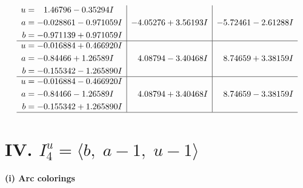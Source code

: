 \documentclass[1p]{elsarticle_modified}
\theoremstyle{definition}
\begin{document}
$$\begin{array}{c|c|c}
\begin{aligned}
u &= \phantom{-}1.46796 - 0.35294 I \\
a &= -0.028861 - 0.971059 I \\
b &= -0.971139 + 0.971059 I\end{aligned}
 & -4.05276 + 3.56193 I & -5.72461 - 2.61288 I \\ \hline\begin{aligned}
u &= -0.016884 + 0.466920 I \\
a &= -0.84466 + 1.26589 I \\
b &= -0.155342 - 1.265890 I\end{aligned}
 & \phantom{-}4.08794 - 3.40468 I & \phantom{-}8.74659 + 3.38159 I \\ \hline\begin{aligned}
u &= -0.016884 - 0.466920 I \\
a &= -0.84466 - 1.26589 I \\
b &= -0.155342 + 1.265890 I\end{aligned}
 & \phantom{-}4.08794 + 3.40468 I & \phantom{-}8.74659 - 3.38159 I\\
 \hline 
 \end{array}$$\newpage\newpage\renewcommand{\arraystretch}{1}
\centering \section*{IV. $I^u_{4}= \langle b,\;a-1,\;u-1 \rangle$}
\flushleft \textbf{(i) Arc colorings}\\
\end{document}
